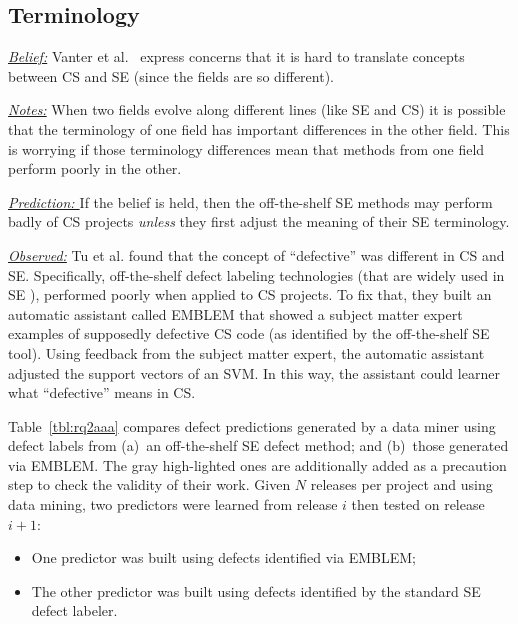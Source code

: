 \documentclass[sigconf]{acmart}
\newcommand{\bi}{\begin{itemize}}
\newcommand{\ei}{\end{itemize}}
\begin{document}
\subsection{Terminology}\label{terms}
\noindent \textit{\underline{Belief:}} 
Vanter et al.~\cite{faulk09_secs, easterbrook_cs, boyle09_lessons} express concerns
that it is hard to translate concepts between  CS and SE (since the fields are so different). 

\noindent \textit{\underline{Notes:}} When two fields evolve along different
lines (like SE and CS) it is possible that the terminology of one field has important
differences in the other field. This is worrying if those terminology differences mean that methods from one field perform poorly in the other.






\noindent \textit{\underline{Prediction: }} If the belief is held, then the off-the-shelf SE methods may perform badly of CS projects {\em unless} they first adjust the meaning of their SE terminology.

\noindent \textit{\underline{Observed:}} Tu et al. \cite{tu2019better} found that the concept of ``defective'' was  different in CS and SE.
Specifically, off-the-shelf defect labeling technologies (that are widely used  in SE \cite{tu2019better,mockus00changeskeys,kamei12_jit, hindle08_largecommits, Kim08changes}),
performed poorly when applied to CS projects.
To fix that, they built an automatic assistant called EMBLEM that showed a subject matter expert 
examples of supposedly defective CS code (as identified by the off-the-shelf SE tool).
Using feedback from the subject matter expert, the automatic assistant adjusted the support vectors of an SVM. In this way, the assistant could learner what ``defective'' means in CS.

Table~\ref{tbl:rq2aaa} 
compares defect predictions generated by a data
miner using defect labels from (a)~an off-the-shelf SE defect method;
and (b)~those generated via EMBLEM. The gray high-lighted ones are additionally added as a precaution step to check the validity of their work. 
Given $N$ releases per project and using data mining, two predictors were learned from release $i$ then tested on release $i+1$:
\bi
\item
One predictor was built using defects identified  via EMBLEM;
\item
The other predictor was built using defects identified by the standard SE defect labeler.
\ei
\end{document}
